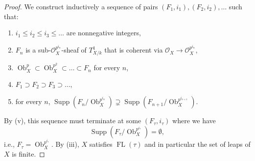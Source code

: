 \documentclass[10pt,a4paper]{amsart}
\newcommand{\FL}[1]{\operatorname{FL}(#1)}
\begin{document}
\begin{proof}
    We construct inductively a sequence of pairs $(F_1,i_1),(F_2,i_2),\dots$ such that:
    \begin{enumerate}
        \item $i_1\le i_2\le i_3\le \dots$ are nonnegative integers,
        \item $F_n$ is a sub-$\mathcal{O}_X^{p^{i_n}}$-sheaf of $T_{X/k}^1$ that is coherent via $\mathcal{O}_X\to\mathcal{O}_X^{p^{i_n}}$,
        \item $\operatorname{Ob}_X^{p}\subset\operatorname{Ob}_X^{p^2}\subset \dots \subset F_n$ for every $n$,
        \item $F_1\supset F_2\supset F_3\supset \dots$,
        \item for every $n$, $\operatorname{Supp}(F_n/\operatorname{Ob}_X^{p^{i_n}})\supsetneq \operatorname{Supp}(F_{n+1}/\operatorname{Ob}_X^{p^{i_{n+1}}})$.
    \end{enumerate}
    By (v), this sequence must terminate at some $(F_\tau,i_\tau)$ where we have $$\operatorname{Supp}(F_\tau/\operatorname{Ob}_X^{p^{i_\tau}})=\emptyset,$$ i.e., $F_\tau=\operatorname{Ob}_X^{p^{i_\tau}}$. By (iii), $X$ satisfies $\FL{\tau}$ and in particular the set of leaps of $X$ is finite.


\end{proof}
\end{document}
